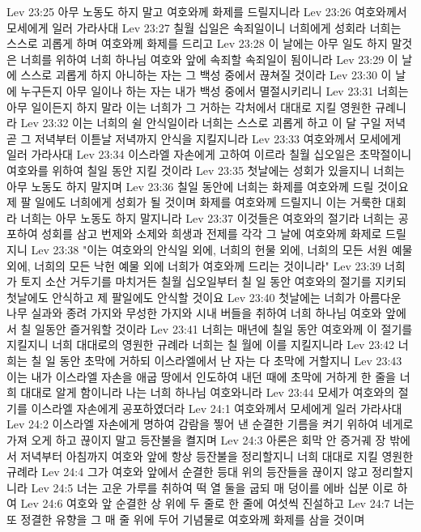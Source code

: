 Lev 23:25  아무 노동도 하지 말고 여호와께 화제를 드릴지니라
Lev 23:26  여호와께서 모세에게 일러 가라사대
Lev 23:27  칠월 십일은 속죄일이니 너희에게 성회라 너희는 스스로 괴롭게 하며 여호와께 화제를 드리고
Lev 23:28  이 날에는 아무 일도 하지 말것은 너희를 위하여 너희 하나님 여호와 앞에 속죄할 속죄일이 됨이니라
Lev 23:29  이 날에 스스로 괴롭게 하지 아니하는 자는 그 백성 중에서 끊쳐질 것이라
Lev 23:30  이 날에 누구든지 아무 일이나 하는 자는 내가 백성 중에서 멸절시키리니
Lev 23:31  너희는 아무 일이든지 하지 말라 이는 너희가 그 거하는 각처에서 대대로 지킬 영원한 규례니라
Lev 23:32  이는 너희의 쉴 안식일이라 너희는 스스로 괴롭게 하고 이 달 구일 저녁 곧 그 저녁부터 이튿날 저녁까지 안식을 지킬지니라
Lev 23:33  여호와께서 모세에게 일러 가라사대
Lev 23:34  이스라엘 자손에게 고하여 이르라 칠월 십오일은 초막절이니 여호와를 위하여 칠일 동안 지킬 것이라
Lev 23:35  첫날에는 성회가 있을지니 너희는 아무 노동도 하지 말지며
Lev 23:36  칠일 동안에 너희는 화제를 여호와께 드릴 것이요 제 팔 일에도 너희에게 성회가 될 것이며 화제를 여호와께 드릴지니 이는 거룩한 대회라 너희는 아무 노동도 하지 말지니라
Lev 23:37  이것들은 여호와의 절기라 너희는 공포하여 성회를 삼고 번제와 소제와 희생과 전제를 각각 그 날에 여호와께 화제로 드릴지니
Lev 23:38  "이는 여호와의 안식일 외에, 너희의 헌물 외에, 너희의 모든 서원 예물외에, 너희의 모든 낙헌 예물 외에 너희가 여호와께 드리는 것이니라"
Lev 23:39  너희가 토지 소산 거두기를 마치거든 칠월 십오일부터 칠 일 동안 여호와의 절기를 지키되 첫날에도 안식하고 제 팔일에도 안식할 것이요
Lev 23:40  첫날에는 너희가 아름다운 나무 실과와 종려 가지와 무성한 가지와 시내 버들을 취하여 너희 하나님 여호와 앞에서 칠 일동안 즐거워할 것이라
Lev 23:41  너희는 매년에 칠일 동안 여호와께 이 절기를 지킬지니 너희 대대로의 영원한 규례라 너희는 칠 월에 이를 지킬지니라
Lev 23:42  너희는 칠 일 동안 초막에 거하되 이스라엘에서 난 자는 다 초막에 거할지니
Lev 23:43  이는 내가 이스라엘 자손을 애굽 땅에서 인도하여 내던 때에 초막에 거하게 한 줄을 너희 대대로 알게 함이니라 나는 너희 하나님 여호와니라
Lev 23:44  모세가 여호와의 절기를 이스라엘 자손에게 공포하였더라
Lev 24:1  여호와께서 모세에게 일러 가라사대
Lev 24:2  이스라엘 자손에게 명하여 감람을 찧어 낸 순결한 기름을 켜기 위하여 네게로 가져 오게 하고 끊이지 말고 등잔불을 켤지며
Lev 24:3  아론은 회막 안 증거궤 장 밖에서 저녁부터 아침까지 여호와 앞에 항상 등잔불을 정리할지니 너희 대대로 지킬 영원한 규례라
Lev 24:4  그가 여호와 앞에서 순결한 등대 위의 등잔들을 끊이지 않고 정리할지니라
Lev 24:5  너는 고운 가루를 취하여 떡 열 둘을 굽되 매 덩이를 에바 십분 이로 하여
Lev 24:6  여호와 앞 순결한 상 위에 두 줄로 한 줄에 여섯씩 진설하고
Lev 24:7  너는 또 정결한 유향을 그 매 줄 위에 두어 기념물로 여호와께 화제를 삼을 것이며
